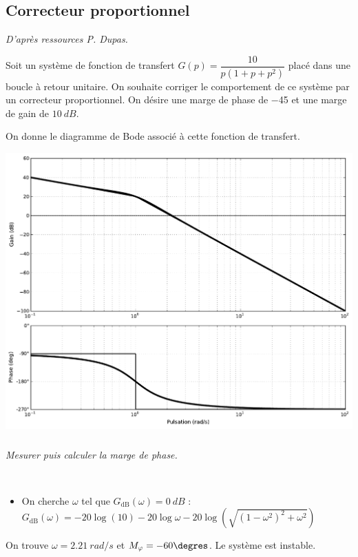 \documentclass[10pt,fleqn]{article} %
\begin{document}
\begin{multicols}{2}


\newpage
\subsection*{Correcteur proportionnel}
\textit{D'après ressources P. Dupas.}


\setcounter{exo}{0}
Soit un système de fonction de transfert $G(p)=\dfrac{10}{p\left(1+p+p^2\right)}$ placé dans une boucle à retour unitaire. On souhaite corriger le comportement de ce système par un correcteur proportionnel. On désire une marge de phase de \SI{-45}{\degres} et une marge de gain de $\SI{10}{dB}$.

On donne le diagramme de Bode associé à cette fonction de transfert. 
\begin{center}
\includegraphics[width=\linewidth]{images/exo_01_bode}
\end{center}


\subparagraph{}\textit{Mesurer puis calculer la marge de phase.}
\ifprof
\begin{corrige}~\\
\begin{itemize}
\item On cherche $\omega$ tel que $G_{\text{dB}}(\omega)=\SI{0}{dB}$  :
$G_{\text{dB}}(\omega)=-20\log(10) -20\log\omega-20\log\left(\sqrt{(1-\omega^2)^2+\omega^2}\right)$
\end{itemize}

On trouve $\omega=\SI{2,21}{rad/s}$ et $M_{\varphi}=-60\degres$. Le système est instable.
\end{corrige}
\else
\fi


\end{multicols}
\end{document}
